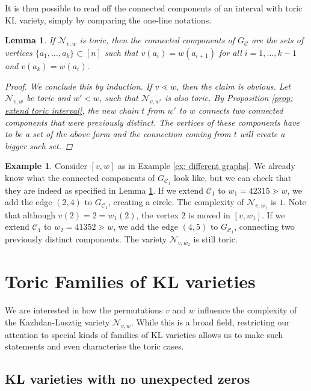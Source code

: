 \documentclass[11pt]{amsart}
\newtheorem{lemma}[theorem]{Lemma}
\theoremstyle{definition}
\newtheorem{example}[theorem]{Example}
\theoremstyle{definition}
\theoremstyle{definition}
\theoremstyle{definition}
\newcommand{\Nvw}{\mathcal{N}_{v,w}}
\begin{document}
\noindent It is then possible to read off the connected components of an interval with toric KL variety, simply by comparing the one-line notations.

\begin{lemma}\label{lem:ccs of GC}
    If $\Nvw$ is toric, then the connected components of $G_{\mathcal C}$ are the sets of vertices $\{a_1, \ldots, a_k\} \subset [n]$ such that $v(a_i)=w(a_{i+1})$ for all $i=1,\ldots,k-1$ and $v(a_k)=w(a_i)$.
    \begin{proof}
        We conclude this by induction. If $v \lessdot w$, then the claim is obvious. Let $\Nvw$ be toric and $w'<w$, such that $\mathcal N_{v,w'}$ is also toric. By Proposition \ref{prop: extend toric interval}, the new chain $t$ from $w'$ to $w$ connects two connected components that were previously distinct. The vertices of these components have to be a set of the above form and the connection coming from $t$ will create a bigger such set.
    \end{proof}
\end{lemma}

\begin{example}
Consider $[v,w]$ as in Example \ref{ex: different graphs}. We already know what the connected components of $G_{\mathcal C_1}$ look like, but we can check that they are indeed as specified in Lemma \ref{lem:ccs of GC}. 
If we extend $\mathcal C_1$ to $w_1 = 42315 \gtrdot w$, we add the edge $(2,4)$ to $G_{\mathcal C_1}$, creating a circle. The complexity of $\mathcal N_{v,w_1}$ is $1$. Note that although $v(2)= 2= w_1(2)$, the vertex $2$ is moved in $[v,w_1]$.
If we extend $\mathcal C_1$ to $w_2 = 41352 \gtrdot w$, we add the edge $(4,5)$ to $G_{\mathcal C_1}$, connecting two previously distinct components. The variety $\mathcal N_{v,w_2}$ is still toric.
\end{example}


\section{Toric Families of KL varieties}\label{sec: toric families of KL}

\noindent
We are interested in how the permutations $v$ and $w$ influence the complexity of the Kazhdan-Lusztig variety $\Nvw$. While this is a broad field, restricting our attention to special kinds of families of KL varieties allows us to make such statements and even characterise the toric cases.
 
\subsection{KL varieties with no unexpected zeros}
\end{document}
